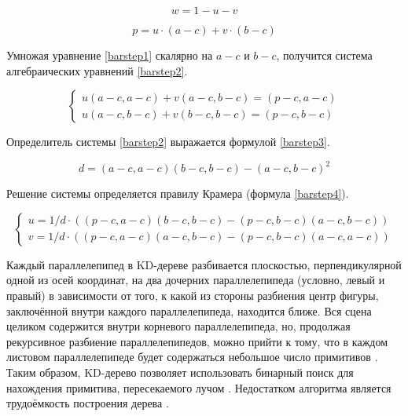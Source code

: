 \begin{equation}
	w = 1 - u -v
\end{equation}

\begin{equation}
	\label{barstep1}
	p = u \cdot (a - c) + v \cdot (b - c)
\end{equation}

Умножая уравнение \ref{barstep1} скалярно на $a - c$ и $b - c$, получится система алгебраических уравнений \ref{barstep2}.

\begin{equation}
	\label{barstep2}
	\begin{cases}
	u(a - c, a - c) + v(a - c, b - c) = (p - c, a - c) \\	
	u(a - c, b - c) + v(b - c, b - c) = (p - c, b - c)
	\end{cases}
\end{equation}

Определитель системы \ref{barstep2} выражается формулой \ref{barstep3}.

\begin{equation}
	\label{barstep3}
	d = (a - c, a - c)(b - c, b - c) - (a - c, b - c)^2
\end{equation}

Решение системы определяется правилу Крамера (формула \ref{barstep4}).

\begin{equation}
	\label{barstep4}
	\begin{cases}
		u = 1 / d \cdot ((p - c, a - c)(b - c, b - c) - (p - c, b - c)(a - c, b - c)) \\	
		v = 1 / d \cdot ((p - c, a - c)(a - c, b - c) - (p - c, b - c)(a - c, a - c))
	\end{cases}
\end{equation}

Каждый параллелепипед в KD-дереве разбивается плоскостью, перпендикулярной одной из осей координат, на два дочерних параллелепипеда (условно, левый и правый) в зависимости от того, к какой из стороны разбиения центр фигуры, заключённой внутри каждого параллелепипеда, находится ближе. 
Вся сцена целиком содержится внутри корневого параллелепипеда, но, продолжая рекурсивное разбиение параллелепипедов, можно прийти к тому, что в каждом листовом параллелепипеде будет содержаться небольшое число примитивов \cite{kdtree}. 
Таким образом, KD-дерево позволяет использовать бинарный поиск для нахождения примитива, пересекаемого лучом \cite{kdtree}.
Недостатком алгоритма является трудоёмкость построения дерева \cite{raytraicecompare}.

